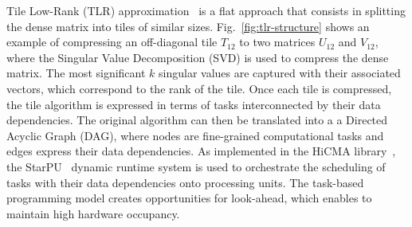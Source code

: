 \documentclass[conference]{IEEEtran}
\begin{document}
Tile Low-Rank (TLR) approximation~\cite{akbudak2017tile,amestoy2015improving} is a flat approach that consists in splitting the dense matrix
into tiles of similar sizes. Fig.~\ref{fig:tlr-structure} shows an example of compressing 
an off-diagonal tile $T_{12}$ to two matrices $U_{12}$ and $V_{12}$,  
where the Singular Value Decomposition (SVD) is used to compress the dense matrix.
The most significant $k$ singular values are captured with their associated vectors, which
correspond to the rank of the tile.
Once each tile is compressed, the tile algorithm is expressed in terms of
tasks interconnected by their data dependencies. The original algorithm can then be translated into a
a Directed Acyclic Graph (DAG), where nodes are fine-grained computational tasks and edges express
their data dependencies. As implemented in the HiCMA library~\cite{hicma-soft}, the StarPU~\cite{augonnet2011starpu} dynamic runtime system
is used to orchestrate the scheduling of tasks with their data dependencies onto processing units.
The task-based programming model creates opportunities for look-ahead, which enables to maintain
high hardware occupancy.


\end{document}
